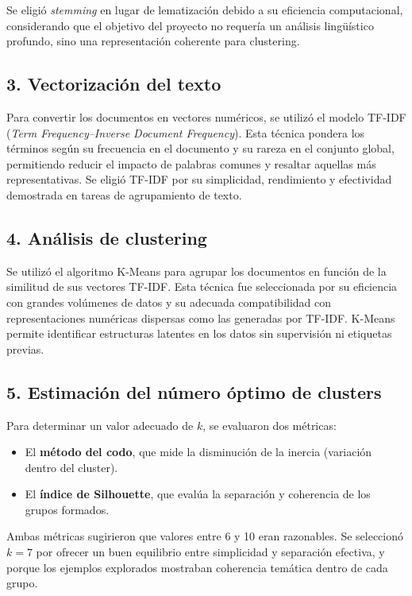 \documentclass[journal]{IEEEtran} %
\begin{document}
Se eligió \textit{stemming} en lugar de lematización debido a su eficiencia computacional, considerando que el objetivo del proyecto no requería un análisis lingüístico profundo, sino una representación coherente para clustering.

\subsection{3. Vectorización del texto}
Para convertir los documentos en vectores numéricos, se utilizó el modelo TF-IDF (\textit{Term Frequency–Inverse Document Frequency}). Esta técnica pondera los términos según su frecuencia en el documento y su rareza en el conjunto global, permitiendo reducir el impacto de palabras comunes y resaltar aquellas más representativas. Se eligió TF-IDF por su simplicidad, rendimiento y efectividad demostrada en tareas de agrupamiento de texto.

\subsection{4. Análisis de clustering}
Se utilizó el algoritmo K-Means para agrupar los documentos en función de la similitud de sus vectores TF-IDF. Esta técnica fue seleccionada por su eficiencia con grandes volúmenes de datos y su adecuada compatibilidad con representaciones numéricas dispersas como las generadas por TF-IDF. K-Means permite identificar estructuras latentes en los datos sin supervisión ni etiquetas previas.

\subsection{5. Estimación del número óptimo de clusters}
Para determinar un valor adecuado de $k$, se evaluaron dos métricas:

\begin{itemize}
    \item El \textbf{método del codo}, que mide la disminución de la inercia (variación dentro del cluster).
    \item El \textbf{índice de Silhouette}, que evalúa la separación y coherencia de los grupos formados.
\end{itemize}

Ambas métricas sugirieron que valores entre 6 y 10 eran razonables. Se seleccionó $k=7$ por ofrecer un buen equilibrio entre simplicidad y separación efectiva, y porque los ejemplos explorados mostraban coherencia temática dentro de cada grupo.
\end{document}
